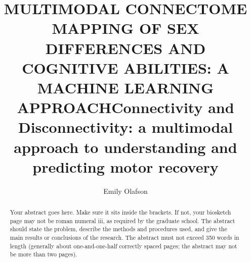 \documentclass[phd,tocprelim]{cornell}
\title {MULTIMODAL CONNECTOME MAPPING OF
SEX DIFFERENCES AND COGNITIVE ABILITIES:
A MACHINE LEARNING APPROACH}
\title {Connectivity and Disconnectivity: a multimodal approach to understanding and predicting motor recovery }
\author {Emily Olafson}
\begin{document}
\maketitle
\makecopyright

\begin{abstract}


Your abstract goes here. Make sure it sits inside the brackets. If not,
your biosketch page may not be roman numeral iii, as required by the
graduate school.
The abstract should state the problem, describe the methods and procedures used, and give the main results or conclusions of the research.
The abstract must not exceed 350 words in length (generally about one-and-one-half correctly spaced pages; the abstract may not be more than two pages).
\end{abstract}
\end{document}
